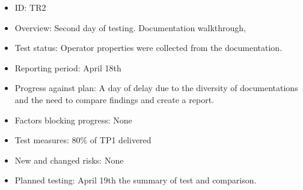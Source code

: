 \begin{itemize}
  \item ID: TR2
  \item Overview: Second day of testing. Documentation walkthrough,
  \item Test status: Operator properties were collected from the documentation.
  \item Reporting period: April 18th
  \item Progress against plan: A day of delay due to the diversity of documentations and the need to compare findings and create a report.
  \item Factors blocking progress: None
  \item Test measures: 80\% of TP1 delivered
  \item New and changed risks: None
  \item Planned testing: April 19th the summary of test and comparison.
\end{itemize}



